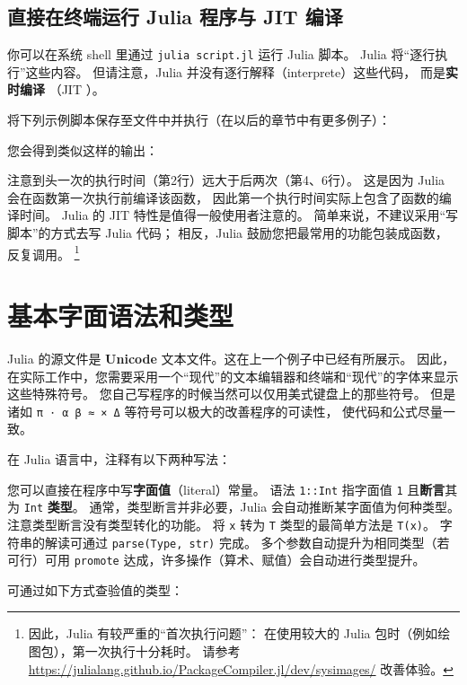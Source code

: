 \documentclass[10pt,a4paper]{article}
\begin{document}
\subsection{直接在终端运行 Julia 程序与 JIT 编译}

你可以在系统 shell 里通过 \lstinline|julia script.jl| 运行 Julia 脚本。
Julia 将“逐行执行”这些内容。
但请注意，Julia 并没有逐行解释（interprete）这些代码，
而是\textbf{实时编译} （JIT ）。

将下列示例脚本保存至文件中并执行（在以后的章节中有更多例子）：

您会得到类似这样的输出：

注意到头一次的执行时间（第2行）远大于后两次（第4、6行）。
这是因为 Julia 会在函数第一次执行前编译该函数，
因此第一个执行时间实际上包含了函数的编译时间。
Julia 的 JIT 特性是值得一般使用者注意的。
简单来说，不建议采用“写脚本”的方式去写 Julia 代码；
相反，Julia 鼓励您把最常用的功能包装成函数，反复调用。
\footnote{
	因此，Julia 有较严重的“首次执行问题”：
	在使用较大的 Julia 包时（例如绘图包），第一次执行十分耗时。
	请参考 \url{https://julialang.github.io/PackageCompiler.jl/dev/sysimages/} 改善体验。
}



\section{基本字面语法和类型}

Julia 的源文件是 \textbf{Unicode} 文本文件。这在上一个例子中已经有所展示。
因此，在实际工作中，您需要采用一个“现代”的文本编辑器和终端和“现代”的字体来显示这些特殊符号。
您自己写程序的时候当然可以仅用美式键盘上的那些符号。
但是诸如 \lstinline|π ⋅ α β ≈ × Δ| 等符号可以极大的改善程序的可读性，
使代码和公式尽量一致。


在 Julia 语言中，注释有以下两种写法：


您可以直接在程序中写\textbf{字面值}（literal）常量。
语法 \lstinline|1::Int| 指字面值 \lstinline|1| 且\textbf{断言}其为 \lstinline|Int| \textbf{类型}。
通常，类型断言并非必要，Julia 会自动推断某字面值为何种类型。
注意类型断言没有类型转化的功能。
将 \lstinline|x| 转为 \lstinline|T| 类型的最简单方法是 \lstinline|T(x)|。
字符串的解读可通过 \lstinline|parse(Type, str)| 完成。
多个参数自动提升为相同类型（若可行）可用 \lstinline|promote| 达成，许多操作（算术、赋值）会自动进行类型提升。


可通过如下方式查验值的类型：

\end{document}

